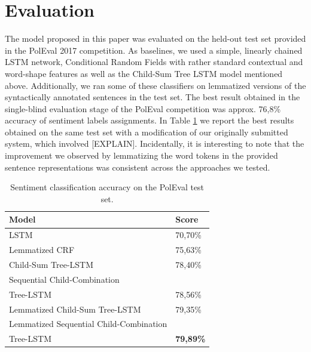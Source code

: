 \documentclass[10pt, a4paper]{article}
\begin{document}
\section{Evaluation} 
	The model proposed in this paper was evaluated on the held-out test set provided in the PolEval 2017 competition. As baselines, we used a simple, linearly chained LSTM network, Conditional Random Fields \cite{lafferty2001conditional} with rather standard contextual and word-shape features as well as the Child-Sum Tree LSTM model mentioned above. Additionally, we ran some of these classifiers on lemmatized versions of the syntactically annotated sentences in the test set. The best result obtained in the single-blind evaluation stage of the PolEval competition was 
approx. 76,8\% accuracy of sentiment labels assignments.  In Table \ref{tab:evaluation} we report the best results obtained on the same test set with a modification of our originally submitted system, which involved [EXPLAIN]. Incidentally, it is interesting to note that the improvement we observed by lemmatizing the word tokens in the provided sentence representations was consistent across the approaches we tested.
\begin{table}[h]
 \begin{center}
\begin{tabular}{|l|l|}

      \hline
      Model & Score\\
      \hline
      \hline
      LSTM &70,70\%\\
      \hline
      Lemmatized CRF & 75,63\%\\
      \hline
      Child-Sum Tree-LSTM &  78,40\%\\
      \hline
      Sequential Child-Combination & \\
      Tree-LSTM & 78,56\%\\
      \hline
      Lemmatized Child-Sum Tree-LSTM & 79,35\%\\
      \hline
      Lemmatized Sequential Child-Combination & \\
      Tree-LSTM & \textbf{79,89\%} \\
      \hline
\end{tabular}
\caption{Sentiment classification accuracy on the PolEval test set.}
\label{tab:evaluation}
 \end{center}
\end{table}
\end{document}
